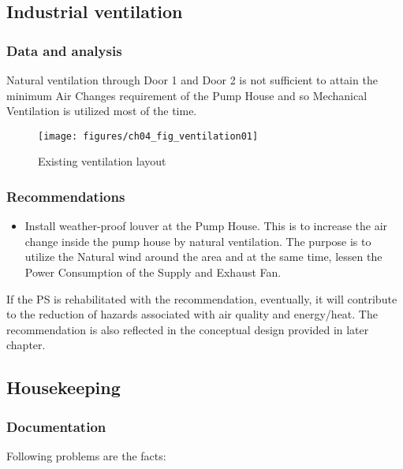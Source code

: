 \subsection{Industrial ventilation}\label{aq04}
\subsubsection{Data and analysis}

Natural ventilation through Door 1 and Door 2 is not sufficient to attain the minimum Air Changes requirement of the Pump House and so Mechanical Ventilation is utilized most of the time.

\begin{figure}[h]
	\texttt{[image: figures/ch04\_fig\_ventilation01]} \\
	\caption{Existing ventilation layout}
	\label{ch04_fig_ventilation01} 
\end{figure}


\subsubsection{Recommendations}

\begin{itemize}
\item Install weather-proof louver at the Pump House. This is to increase the air change inside the pump house by natural ventilation. The purpose is to utilize the Natural wind around the area and at the same time, lessen the Power Consumption of the Supply and Exhaust Fan. 
\end{itemize}

If the PS is rehabilitated with the recommendation, eventually, it will contribute to the reduction of hazards associated with air quality and energy/heat. The recommendation is also reflected in the conceptual design provided in later chapter.


\subsection{Housekeeping}\label{aq05}
\subsubsection{Documentation}
Following problems are the facts:

